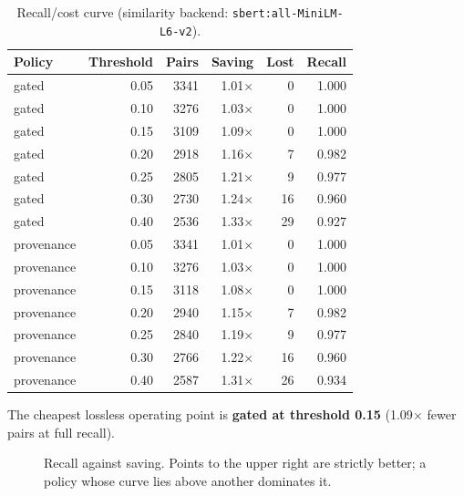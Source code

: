 \documentclass[11pt]{article}
\begin{document}
\begin{table}[htbp]
\centering
\begin{tabular}{lrrrrr}
\toprule
Policy & Threshold & Pairs & Saving & Lost & Recall \\
\midrule
gated & 0.05 & 3341 & 1.01$\times$ & 0 & 1.000 \\
gated & 0.10 & 3276 & 1.03$\times$ & 0 & 1.000 \\
gated & 0.15 & 3109 & 1.09$\times$ & 0 & 1.000 \\
gated & 0.20 & 2918 & 1.16$\times$ & 7 & 0.982 \\
gated & 0.25 & 2805 & 1.21$\times$ & 9 & 0.977 \\
gated & 0.30 & 2730 & 1.24$\times$ & 16 & 0.960 \\
gated & 0.40 & 2536 & 1.33$\times$ & 29 & 0.927 \\
provenance & 0.05 & 3341 & 1.01$\times$ & 0 & 1.000 \\
provenance & 0.10 & 3276 & 1.03$\times$ & 0 & 1.000 \\
provenance & 0.15 & 3118 & 1.08$\times$ & 0 & 1.000 \\
provenance & 0.20 & 2940 & 1.15$\times$ & 7 & 0.982 \\
provenance & 0.25 & 2840 & 1.19$\times$ & 9 & 0.977 \\
provenance & 0.30 & 2766 & 1.22$\times$ & 16 & 0.960 \\
provenance & 0.40 & 2587 & 1.31$\times$ & 26 & 0.934 \\
\bottomrule
\end{tabular}
\caption{Recall/cost curve (similarity backend: \texttt{sbert:all-MiniLM-L6-v2}).}
\label{tab:sweep}
\end{table}

The cheapest lossless operating point is \textbf{gated at threshold 0.15} (1.09$\times$ fewer pairs at full recall).

\begin{figure}[htbp]
\centering
{}
\caption{Recall against saving. Points to the upper right are strictly better; a policy whose curve lies above another dominates it.}
\label{fig:sweep}
\end{figure}
\end{document}
